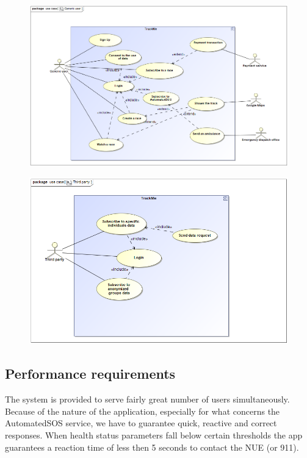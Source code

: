 \begin{figure}[h!] \ContinuedFloat
\centering
\includegraphics[scale=0.5]{sections/diagrams/Generic_user.png} \newline
{}
\end{figure}

\begin{figure}[h!] \ContinuedFloat
\centering
\includegraphics[scale=0.5]{sections/diagrams/Third_Party.png} \newline
{}
\end{figure}

\subsection{Performance requirements}
The system is provided to serve fairly great number of users simultaneously. Because of the nature of the application, especially for what concerns the AutomatedSOS service, we have to guarantee quick, reactive and correct responses. When health status parameters fall below certain thresholds the app guarantees a reaction time of less then 5 seconds to contact the NUE (or 911).

